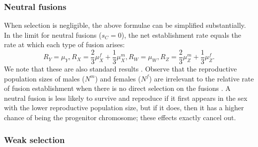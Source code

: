 \subsubsection{Neutral fusions}
When selection is negligible, the above formulae can be simplified substantially. In the limit for neutral fusions ($s_C=\text{0}$), the net establishment rate equals the rate at which each type of fusion arises: 
\begin{subequations}
\begin{equation}
R_Y=\mu_Y,
\end{equation}
\begin{equation}
R_X=\frac{\text{2}}{\text{3}}\mu^f_X + \frac{\text{1}}{\text{3}}\mu^m_X,
\end{equation}
\begin{equation}
R_W=\mu_W,
\end{equation}
\begin{equation}
R_Z=\frac{\text{2}}{\text{3}}\mu^m_Z + \frac{\text{1}}{\text{3}}\mu^f_Z.
\end{equation}
\end{subequations}
We note that these are also standard results \citep[e.g.,][]{Kirkpatrick2004, Vicoso2009}. Observe that the reproductive population sizes of males ($N^m$) and females ($N^f$) are irrelevant to the relative rate of fusion establishment when there is no direct selection on the fusions \citep{Charlesworth1980}. A neutral fusion is less likely to survive and reproduce if it first appears in the sex with the lower reproductive population size, but if it does, then it has a higher chance of being the progenitor chromosome; these effects exactly cancel out.

\subsubsection{Weak selection}

